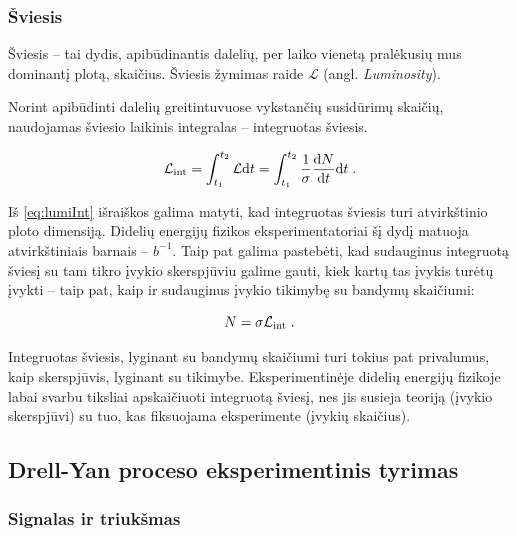\documentclass[a4paper, 12pt]{article}
\newcommand{\Lumi}{{\cal L}_\mathrm{int}}
\newlength\q
\begin{document}
\subsubsection*{Šviesis}

Šviesis -- tai dydis, apibūdinantis dalelių, per laiko vienetą pralėkusių mus
dominantį plotą, skaičius. Šviesis žymimas raide $\mathcal{L}$ (angl. \textit{Luminosity}).

Norint apibūdinti dalelių greitintuvuose vykstančių susidūrimų skaičių, naudojamas šviesio
laikinis integralas -- integruotas šviesis.

\begin{equation}
	\Lumi=\int_{t_1}^{t_2} \mathcal{L}\mathrm{d}t =
	\int_{t_1}^{t_2} \frac{1}{\sigma}\frac{\mathrm{d}N}{\mathrm{d}t} \mathrm{d}t \; .
\label{eq:lumiInt}
\end{equation}

Iš \eqref{eq:lumiInt} išraiškos galima matyti, kad integruotas šviesis turi atvirkštinio ploto
dimensiją.
Didelių energijų fizikos eksperimentatoriai šį dydį matuoja atvirkštiniais barnais -- $b^{-1}$.
Taip pat galima pastebėti, kad sudauginus integruotą šviesį su tam tikro įvykio skerspjūviu
galime gauti, kiek kartų tas įvykis turėtų įvykti -- taip pat, kaip ir sudauginus įvykio tikimybę
su bandymų skaičiumi:

\begin{equation}
	N=\sigma\Lumi \; .
\label{eq:evno}
\end{equation}

Integruotas šviesis, lyginant su bandymų skaičiumi turi tokius pat privalumus, kaip skerspjūvis,
lyginant su tikimybe.
Eksperimentinėje didelių energijų fizikoje labai svarbu tiksliai apskaičiuoti integruotą šviesį,
nes jis susieja teoriją (įvykio skerspjūvi) su tuo, kas fiksuojama eksperimente (įvykių skaičius).


\subsection{Drell-Yan proceso eksperimentinis tyrimas}

\subsubsection{Signalas ir triukšmas}
\end{document}

